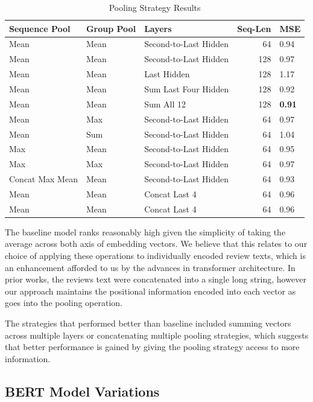 \documentclass[11pt,a4paper]{article}
\begin{document}
\begin{table}[t!]
\centering
\small
\begin{tabular}{@{} *3l r l @{}}
\toprule
\multicolumn{1}{l}{\textbf{Sequence Pool}} & \textbf{Group Pool} & \textbf{Layers} & \textbf{Seq-Len} & \textbf{MSE}  \\ 
\midrule
 Mean & Mean & Second-to-Last Hidden & 64 & 0.94 \\ 
 Mean & Mean & Second-to-Last Hidden & 128 & \textcolor[rgb]{0.098,0.098,0.098}{0.97} \\
 Mean & Mean & Last Hidden & 128 & 1.17 \\
 Mean & Mean & Sum Last Four Hidden  & 128 & 0.92 \\
 Mean & Mean & Sum All 12 & 128 & \textbf{0.91} \\
 Mean & Max & Second-to-Last Hidden & 64 & 0.97 \\
 Mean & Sum & Second-to-Last Hidden & 64 & 1.04 \\
 Max & Mean & Second-to-Last Hidden & 64 & 0.95 \\
 Max & Max & Second-to-Last Hidden & 64 & 0.97 \\
 Concat Max Mean & Mean & Second-to-Last Hidden & 64 & 0.93 \\
 Mean & Mean & Concat Last 4 & 64 & 0.96 \\
 Mean & Mean & Concat Last 4 & 64 & 0.96 \\
\bottomrule
\end{tabular}
\caption{Pooling Strategy Results}
\label{table:1}
\end{table}

The baseline model ranks reasonably high given the simplicity of taking the average across both axis of embedding vectors.  We believe that this relates to our choice of applying these operations to individually encoded review texts, which is an enhancement afforded to us by the advances in transformer architecture.  In prior works, the reviews text were concatenated into a single long string, however our approach maintains the positional information encoded into each vector as goes into the pooling operation.

The strategies that performed better than baseline included summing vectors across multiple layers or concatenating multiple pooling strategies, which suggests that better performance is gained by giving the pooling strategy access to more information.   

\subsection{BERT Model Variations}
\end{document}
